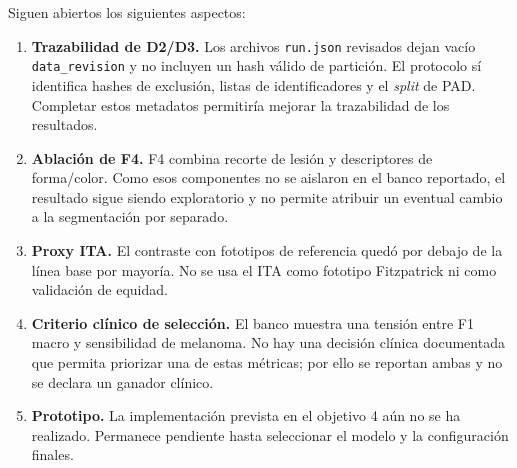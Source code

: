 Siguen abiertos los siguientes aspectos:
\begin{enumerate}
    \item \textbf{Trazabilidad de D2/D3.} Los archivos \texttt{run.json} revisados dejan vacío \texttt{data\_revision} y no incluyen un hash válido de partición. El protocolo sí identifica hashes de exclusión, listas de identificadores y el \textit{split} de PAD. Completar estos metadatos permitiría mejorar la trazabilidad de los resultados.
    \item \textbf{Ablación de F4.} F4 combina recorte de lesión y descriptores de forma/color. Como esos componentes no se aislaron en el banco reportado, el resultado sigue siendo exploratorio y no permite atribuir un eventual cambio a la segmentación por separado.
    \item \textbf{Proxy ITA.} El contraste con fototipos de referencia quedó por debajo de la línea base por mayoría. No se usa el ITA como fototipo Fitzpatrick ni como validación de equidad.
    \item \textbf{Criterio clínico de selección.} El banco muestra una tensión entre F1 macro y sensibilidad de melanoma. No hay una decisión clínica documentada que permita priorizar una de estas métricas; por ello se reportan ambas y no se declara un ganador clínico.
    \item \textbf{Prototipo.} La implementación prevista en el objetivo 4 aún no se ha realizado. Permanece pendiente hasta seleccionar el modelo y la configuración finales.
\end{enumerate}




